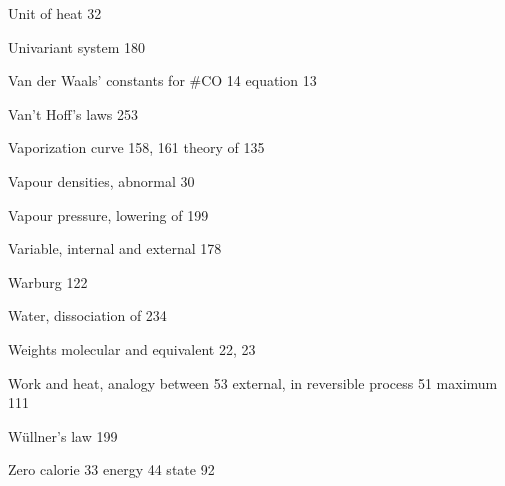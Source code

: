 \documentclass[12pt]{book}[2005/09/16]
\begin{document}

Unit of heat 32

Univariant system 180



Van der Waals'
  constants for #CO 14
  equation 13

Van't Hoff's laws 253

Vaporization curve 158, 161
  theory of 135

Vapour densities, abnormal 30

Vapour pressure, lowering of 199

Variable, internal and external 178



Warburg 122

Water, dissociation of 234

Weights molecular and equivalent 22, 23

Work
  and heat, analogy between 53
  external, in reversible process 51
  maximum 111

Wüllner's law 199



Zero
  calorie 33
  energy 44
  state 92

\fi

\end{document}
